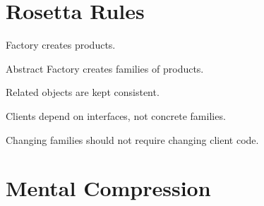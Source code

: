 \documentclass[11pt,a4paper]{book}
\begin{document}
\section{Rosetta Rules}

\begin{rosettarule}

Factory creates products.

\end{rosettarule}


\begin{rosettarule}

Abstract Factory creates
families of products.

\end{rosettarule}


\begin{rosettarule}

Related objects are kept
consistent.

\end{rosettarule}


\begin{rosettarule}

Clients depend on interfaces,
not concrete families.

\end{rosettarule}


\begin{rosettarule}

Changing families should not
require changing client code.

\end{rosettarule}

\section{Mental Compression}
\end{document}
